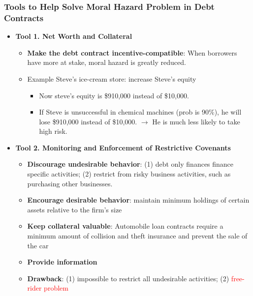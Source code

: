 \documentclass[aspectratio=169]{beamer}
\begin{document}
\begin{frame}
\frametitle{Tools to Help Solve Moral Hazard Problem in Debt Contracts}


\begin{itemize}
    \item \textbf{Tool 1. Net Worth and Collateral}
    \begin{itemize}
        \item \textbf{Make the debt contract incentive-compatible}: When borrowers have more at stake, moral hazard is greatly reduced. 
        \item Example Steve's ice-cream store: increase Steve's equity
        \begin{itemize}
            \item Now steve's equity is \$910,000 instead of \$10,000. 
            \item If Steve is unsuccessful in chemical machines (prob is 90\%), he will lose \$910,000  instead of \$10,000. $\rightarrow$ He is much less likely to take high risk. 
        \end{itemize}      
    \end{itemize}
    \item \textbf{Tool 2. Monitoring and Enforcement of Restrictive Covenants} 
    \begin{itemize}
        \item \textbf{Discourage undesirable behavior}: (1) debt only finances finance specific activities; (2) restrict from risky business activities, such as purchasing other businesses.
        \item \textbf{Encourage desirable behavior}: maintain minimum holdings of certain assets relative to the firm’s size
        \item \textbf{Keep collateral valuable}: Automobile loan contracts require a minimum amount of collision and theft insurance and prevent the sale of the car
        \item \textbf{Provide information}
        \item \textbf{Drawback}: (1) impossible to restrict all undesirable activities; (2) \textcolor{red}{free-rider problem}
    \end{itemize}
\end{itemize}



\end{frame}
\end{document}
